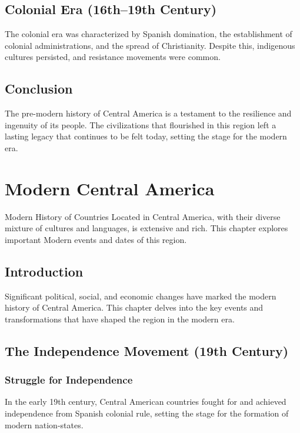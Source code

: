 \documentclass[a4paper,12pt]{book}
\begin{document}
\section{Colonial Era (16th–19th Century)}
\label{sec:colonial-era}
The colonial era was characterized by Spanish domination, the establishment of colonial administrations, and the spread of Christianity. Despite this, indigenous cultures persisted, and resistance movements were common.

\section{Conclusion}
\label{sec:conclusion-pre-modern-central-america}
The pre-modern history of Central America is a testament to the resilience and ingenuity of its people. The civilizations that flourished in this region left a lasting legacy that continues to be felt today, setting the stage for the modern era.

\chapter{Modern Central America}
\label{ch:modern-history-central-america}

Modern History of Countries Located in Central America, with their diverse mixture of cultures and languages, is extensive and rich. This chapter explores important Modern events and dates of this region.

\section{Introduction}
\label{sec:introduction-modern-central-america}
Significant political, social, and economic changes have marked the modern history of Central America. This chapter delves into the key events and transformations that have shaped the region in the modern era.

\section{The Independence Movement (19th Century)}
\label{sec:independence-movement}
\subsection{Struggle for Independence}
\label{subsec:struggle-independence}
In the early 19th century, Central American countries fought for and achieved independence from Spanish colonial rule, setting the stage for the formation of modern nation-states.
\end{document}
